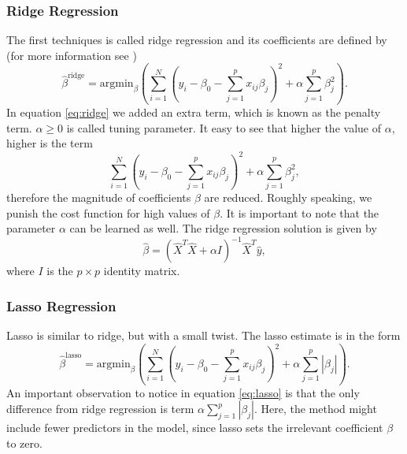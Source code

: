 \documentclass [11pt]{article}
\begin{document}
\subsubsection*{Ridge Regression}
The first techniques is called ridge regression and its coefficients are defined by (for more information see \cite{TRJ})
\begin{equation}
\hat{\beta}^{\text{ridge}}=\text{argmin}_{\beta} ( \sum_{i=1}^{N}(y_{i}- \beta_{0}- \sum_{j=1}^{p}x_{ij}\beta_{j})^{2}+ \alpha \sum_{j=1}^{p} \beta_{j}^{2}).
\label{eq:ridge}
\end{equation}
In equation \eqref{eq:ridge} we added an extra term, which is known as the penalty term. $\alpha \geq 0$ is called tuning parameter. It easy to see that higher the value of $\alpha$, higher is the term 
\begin{equation*}
\sum_{i=1}^{N}(y_{i}- \beta_{0}- \sum_{j=1}^{p}x_{ij}\beta_{j})^{2}+ \alpha \sum_{j=1}^{p} \beta_{j}^{2},
\end{equation*}
therefore the magnitude of coefficients $\beta$ are reduced. Roughly speaking, we punish the cost function for high values of $\beta$. It is important to note that the parameter $\alpha$ can be learned as well. The ridge regression solution is given by
\begin{equation}
\hat{\beta} =\left(\hat{X}^T\hat{X} + \alpha I \right)^{-1}\hat{X}^T\hat{y},
\end{equation}
where $I$ is the $p \times p$ identity matrix.
\subsubsection*{Lasso Regression}
Lasso is similar to ridge, but with a small twist. The lasso estimate is in the form \cite{TRJ}
\begin{equation}
\hat{\beta}^{\text{lasso}}=\text{argmin}_{\beta} ( \sum_{i=1}^{N}(y_{i}- \beta_{0}- \sum_{j=1}^{p}x_{ij}\beta_{j})^{2}+ \alpha \sum_{j=1}^{p} |\beta_{j}|).
\label{eq:lasso}
\end{equation}
An important observation to notice in equation \eqref{eq:lasso} is that the only difference from ridge regression is term $\alpha \sum_{j=1}^{p} |\beta_{j}|$. Here, the method might include fewer predictors in the model, since lasso sets the irrelevant coefficient $\beta$ to zero.
\end{document}
